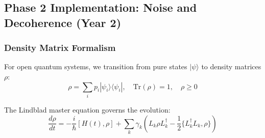 \documentclass[12pt,a4paper]{article}
\begin{document}
\subsection{Phase 2 Implementation: Noise and Decoherence (Year 2)}

\subsubsection{Density Matrix Formalism}

For open quantum systems, we transition from pure states $|\psi\rangle$ to density matrices $\rho$:
\begin{equation}
\rho = \sum_i p_i |\psi_i\rangle\langle\psi_i|, \quad \text{Tr}(\rho) = 1, \quad \rho \geq 0
\label{eq:density-matrix}
\end{equation}

The Lindblad master equation governs the evolution:
\begin{equation}
\frac{d\rho}{dt} = -\frac{i}{\hbar}[H(t), \rho] + \sum_k \gamma_k \left(L_k \rho L_k^\dagger - \frac{1}{2}\{L_k^\dagger L_k, \rho\}\right)
\label{eq:lindblad-full}
\end{equation}
\end{document}
